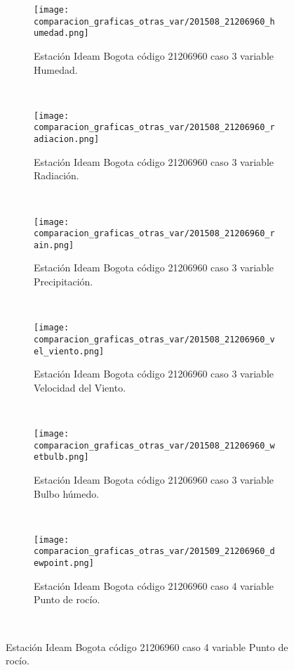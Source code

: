 \begin{figure}[H]
\centering
\begin{subfigure}[normla]{0.4\textwidth}
\caption{Estación Ideam Bogota código 21206960 caso 3 variable Humedad.}
\texttt{[image: comparacion\_graficas\_otras\_var/201508\_21206960\_humedad.png]}
\end{subfigure}
~
\begin{subfigure}[normla]{0.4\textwidth}
\caption{Estación Ideam Bogota código 21206960 caso 3 variable Radiación.}
\texttt{[image: comparacion\_graficas\_otras\_var/201508\_21206960\_radiacion.png]}
\end{subfigure}
~
\begin{subfigure}[normla]{0.4\textwidth}
\caption{Estación Ideam Bogota código 21206960 caso 3 variable Precipitación.}
\texttt{[image: comparacion\_graficas\_otras\_var/201508\_21206960\_rain.png]}
\end{subfigure}
~
\begin{subfigure}[normla]{0.4\textwidth}
\caption{Estación Ideam Bogota código 21206960 caso 3 variable Velocidad del Viento.}
\texttt{[image: comparacion\_graficas\_otras\_var/201508\_21206960\_vel\_viento.png]}
\end{subfigure}
~
\begin{subfigure}[normla]{0.4\textwidth}
\caption{Estación Ideam Bogota código 21206960 caso 3 variable Bulbo húmedo.}
\texttt{[image: comparacion\_graficas\_otras\_var/201508\_21206960\_wetbulb.png]}
\end{subfigure}
~
\begin{subfigure}[normla]{0.4\textwidth}
\caption{Estación Ideam Bogota código 21206960 caso 4 variable Punto de rocío.}
\texttt{[image: comparacion\_graficas\_otras\_var/201509\_21206960\_dewpoint.png]}
\end{subfigure}
~
\end{figure}
           
